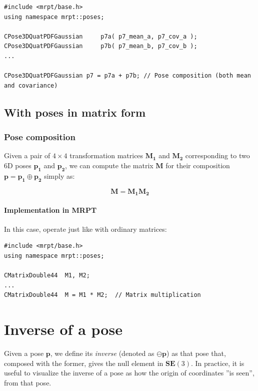 \documentclass[a4paper,11pt]{report}
\begin{document}
\begin{lstlisting}
#include <mrpt/base.h> 
using namespace mrpt::poses; 

CPose3DQuatPDFGaussian     p7a( p7_mean_a, p7_cov_a ); 
CPose3DQuatPDFGaussian     p7b( p7_mean_b, p7_cov_b ); 
...

CPose3DQuatPDFGaussian p7 = p7a + p7b; // Pose composition (both mean and covariance)
\end{lstlisting}




\section{With poses in matrix form}
\label{sect:comp_poses:mat}

\subsection{Pose composition}

Given a pair of $4\times 4$ transformation matrices 
$\mathbf{M_1}$ and $\mathbf{M_2}$ corresponding to two 6D poses
$\mathbf{p_1}$ and $\mathbf{p_2}$, we can compute the 
matrix $\mathbf{M}$ for their composition $\mathbf{p} = \mathbf{p_1} \oplus \mathbf{p_2}$ 
simply as:

\begin{equation}
\mathbf{M} =  \mathbf{M_1}  \mathbf{M_2}
\end{equation}

\subsubsection{Implementation in MRPT}

In this case, operate just like with ordinary matrices:

\begin{lstlisting}
#include <mrpt/base.h> 
using namespace mrpt::poses; 

CMatrixDouble44  M1, M2;
...
CMatrixDouble44  M = M1 * M2;  // Matrix multiplication
\end{lstlisting}



\chapter{Inverse of a pose}
\label{sect:inverse}

Given a pose $\mathbf{p}$, we define its \emph{inverse} 
(denoted as $\ominus \mathbf{p}$) 
as that pose that, composed with the former, gives the null element 
in $\mathbf{SE}(3)$. 
In practice, it is useful to visualize the inverse of a pose as 
how the origin of coordinates ''is seen'', from that pose.
\end{document}
